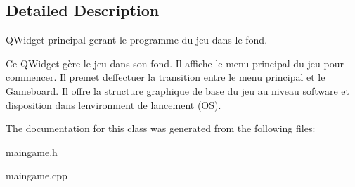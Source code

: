 \subsection{Detailed Description}
Q\+Widget principal gerant le programme du jeu dans le fond. 

Ce Q\+Widget gère le jeu dans son fond. Il affiche le menu principal du jeu pour commencer. Il premet d\textquotesingle{}effectuer la transition entre le menu principal et le \hyperlink{class_gameboard}{Gameboard}. Il offre la structure graphique de base du jeu au niveau software et disposition dans l\textquotesingle{}environment de lancement (O\+S). 

The documentation for this class was generated from the following files\+:\begin{DoxyCompactItemize}
\item 
maingame.\+h\item 
maingame.\+cpp\end{DoxyCompactItemize}
